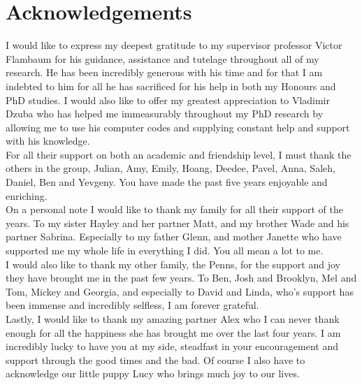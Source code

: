\documentclass[10pt,a4paper, twoside, openright]{report}
\begin{document}
\chapter*{Acknowledgements}
\thispagestyle{empty}
I would like to express my deepest gratitude to my supervisor professor Victor Flambaum for his guidance, assistance and tutelage throughout all of my research. He has been incredibly generous with his time and  for that  I am indebted to him for all he has sacrificed for his help in both my Honours and PhD studies. I would also like to offer my greatest appreciation to  Vladimir Dzuba who has helped me immeasurably throughout my PhD research by allowing me to use his computer codes and supplying constant help and support with his knowledge. \\
\linebreak
For all their support on both an academic and friendship level, I must thank the others in the group, Julian, Amy, Emily, Hoang, Deedee, Pavel, Anna, Saleh, Daniel, Ben and Yevgeny. You have made the past five years enjoyable and enriching.  \\
\linebreak
On a personal note I would like to thank my family for all their support of the years. To my sister Hayley and her partner Matt, and my brother Wade and his partner Sabrina. Especially to my father Glenn, and mother Janette who have supported me my whole life in everything I did. You all mean a lot to me.\\
\linebreak
I would also like to thank my other family, the Penns, for the support and joy they have brought me in the past few years. To Ben, Josh and Brooklyn, Mel and Tom, Mickey and Georgia, and especially to David and Linda, who's support has been immense and incredibly selfless, I am forever grateful.\\
\linebreak
Lastly, I would like to thank my amazing partner Alex who I can never thank enough for all the happiness she has brought me over the last four years. I am incredibly lucky to have you at my side, steadfast in your encouragement and support through the good times and the bad. Of course I also have to acknowledge our little puppy Lucy who brings much joy to our lives.
\clearpage
\end{document}
